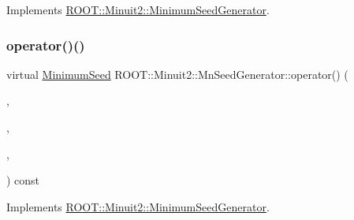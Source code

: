 Implements \mbox{\hyperlink{classROOT_1_1Minuit2_1_1MinimumSeedGenerator_ae71de52027d3f0c7fa202c7cf65b947a}{R\+O\+O\+T\+::\+Minuit2\+::\+Minimum\+Seed\+Generator}}.

\mbox{\label{classROOT_1_1Minuit2_1_1MnSeedGenerator_a1c06ece239f548163beb232600dc8cc3}} 
\subsubsection{\texorpdfstring{operator()()}{operator()()}\hspace{0.1cm}{\footnotesize\ttfamily [3/6]}}
{\footnotesize\ttfamily virtual \mbox{\hyperlink{classROOT_1_1Minuit2_1_1MinimumSeed}{Minimum\+Seed}} R\+O\+O\+T\+::\+Minuit2\+::\+Mn\+Seed\+Generator\+::operator() (\begin{DoxyParamCaption}\item[{const \mbox{\hyperlink{classROOT_1_1Minuit2_1_1MnFcn}{Mn\+Fcn}} \&}]{,  }\item[{const \mbox{\hyperlink{classROOT_1_1Minuit2_1_1GradientCalculator}{Gradient\+Calculator}} \&}]{,  }\item[{const \mbox{\hyperlink{classROOT_1_1Minuit2_1_1MnUserParameterState}{Mn\+User\+Parameter\+State}} \&}]{,  }\item[{const \mbox{\hyperlink{classROOT_1_1Minuit2_1_1MnStrategy}{Mn\+Strategy}} \&}]{ }\end{DoxyParamCaption}) const\hspace{0.3cm}{\ttfamily [virtual]}}



Implements \mbox{\hyperlink{classROOT_1_1Minuit2_1_1MinimumSeedGenerator_ae71de52027d3f0c7fa202c7cf65b947a}{R\+O\+O\+T\+::\+Minuit2\+::\+Minimum\+Seed\+Generator}}.

\mbox{\label{classROOT_1_1Minuit2_1_1MnSeedGenerator_aeba9e3b985e5d74e797cafaffec74de3}} 

